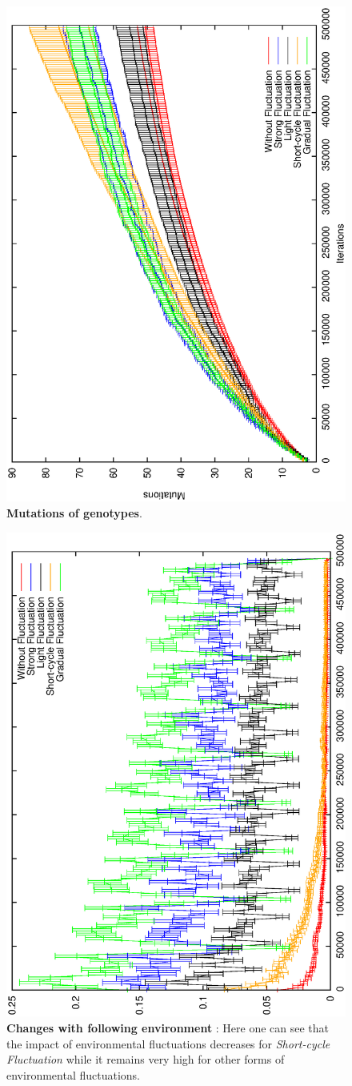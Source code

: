 \documentclass[letterpaper]{article}
\begin{document}
\begin{figure}[h]
\centering
\includegraphics[width=0.7\columnwidth, angle =-90 ]{img/Mutations}
\caption{\textbf{Mutations of genotypes}.
}
\label{Mutations}
\end{figure}

\begin{figure}[h]
\centering
\includegraphics[width=0.7\columnwidth, angle =-90 ]{img/diffProp}
\caption{\textbf{Changes with following environment} : Here one can see that the impact of environmental fluctuations decreases for \emph{Short-cycle  Fluctuation} while it remains very high for other forms of environmental fluctuations.
}
\label{Mutations}
\end{figure}
\end{document}
